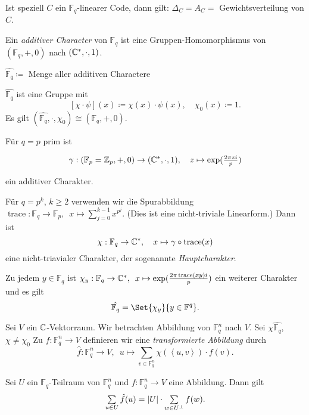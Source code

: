 \documentclass{cheat-sheet}
\newcommand{\F}{\mathbb{F}} %
\newcommand{\scp}[2]{\left\langle #1, #2 \right\rangle} %
\DeclareMathOperator{\trace}{trace} %
\begin{document}
\begin{prop}
  Ist speziell $C$ ein $\F_q$-linearer Code, dann gilt: $\Delta_C = A_C = $ Gewichtsverteilung von $C$.
\end{prop}


\begin{defn}
  Ein \emph{additiver Character} von $\F_q$ ist eine Gruppen-Homomorphismus von $(\F_q, +, 0)$ nach $(\mathbb{C}^*, \cdot, 1)$.
\end{defn}

\begin{nota}
  $\hat{\F_q} \coloneqq $ Menge aller additiven Charactere
\end{nota}

\begin{bem}
  $\hat{\F_q}$ ist eine Gruppe mit
  \[
    [\chi \cdot \psi](x) \coloneqq \chi(x) \cdot \psi(x), \quad
    \chi_0(x) \coloneqq 1.
  \]
  Es gilt $(\hat{\F_q}, \cdot, \chi_0) \cong (\F_q, +, 0)$.
\end{bem}



Für $q = p$ prim ist

\[
  \gamma : (\F_p = \Z_p, +, 0) \to (\C^*, \cdot, 1), \quad
  z \mapsto \exp(\tfrac{2 \pi z i}{p})
\]

ein additiver Charakter.

Für $q = p^k$, $k \geq 2$ verwenden wir die Spurabbildung
$\trace : \F_q \to \F_p, \enspace x \mapsto \sum_{j=0}^{k-1} x^{p^j}$.
(Dies ist eine nicht-triviale Linearform.)
Dann ist
\[
  \chi : \F_q \to \C^*, \quad
  x \mapsto \gamma \circ \trace(x)
\]
eine nicht-triavialer Charakter, der sogenannte \emph{Hauptcharakter}.

\begin{bem}
  Zu jedem $y \in \F_q$ ist $\chi_y : \F_q \to \C^*, \enspace x \mapsto \exp(\frac{2 \pi \trace(xy) i}{p})$ ein weiterer Charakter und es gilt
  \[ \hat{\F_q} = \Set{\chi_y}{y \in \F^q}. \]
\end{bem}

Sei $V$ ein $\mathbb{C}$-Vektorraum.
Wir betrachten Abbildung von $\F_q^n$ nach $V$.
Sei $\chi \hat{\F_q}$, $\chi \neq \chi_0$
Zu $f : \F_q^n \to V$ definieren wir eine \emph{transformierte Abbildung} durch
\[ \hat{f} : \F_q^n \to V, \enspace u \mapsto \sum_{v \in \F_q^n} \chi(\scp{u}{v}) \cdot f(v). \]

\begin{satz}
  Sei $U$ ein $\F_q$-Teilraum von $\F_q^n$ und $f : \F_q^n \to V$ eine Abbildung.
  Dann gilt
  \[
    \sum_{u \in U} \hat{f}(u) = \abs{U} \cdot \sum_{w \in U^\perp} f(w).
  \]
\end{satz}
\end{document}
